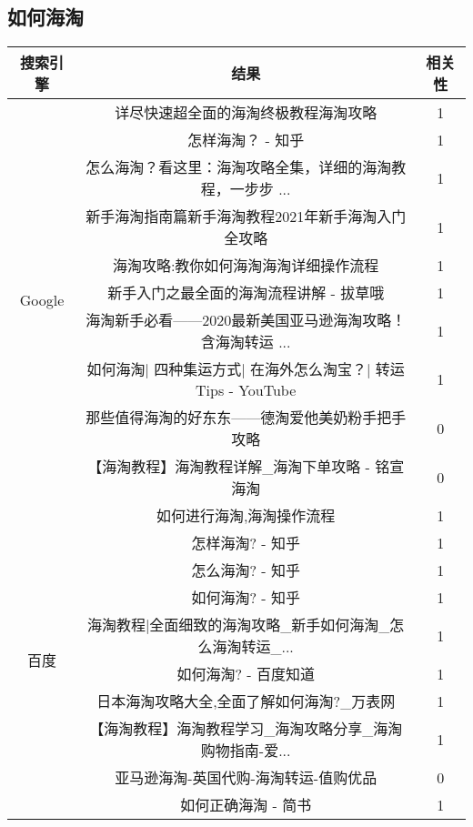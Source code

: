 \documentclass[a4paper]{article}
\begin{document}
\subsection{如何海淘}

\begin{center}
  \begin{tabular}{ |c|c|c| }
    \hline
    搜索引擎 & 结果 & 相关性 \\ \hline
    \multirow{10}{*}{Google}  & 详尽快速超全面的海淘终极教程海淘攻略 & 1 \\ \cline{2-3}
    & 怎样海淘？ - 知乎 & 1 \\ \cline{2-3}
    & 怎么海淘？看这里：海淘攻略全集，详细的海淘教程，一步步 ... & 1 \\ \cline{2-3}
    & 新手海淘指南篇新手海淘教程2021年新手海淘入门全攻略 & 1 \\ \cline{2-3}
    & 海淘攻略:教你如何海淘海淘详细操作流程 & 1 \\ \cline{2-3}
    & 新手入门之最全面的海淘流程讲解 - 拔草哦 & 1 \\ \cline{2-3}
    & 海淘新手必看——2020最新美国亚马逊海淘攻略！含海淘转运 ... & 1 \\ \cline{2-3}
    & 如何海淘| 四种集运方式| 在海外怎么淘宝？| 转运Tips - YouTube & 1 \\ \cline{2-3}
    & 那些值得海淘的好东东——德淘爱他美奶粉手把手攻略 & 0 \\ \cline{2-3}
    & 【海淘教程】海淘教程详解\_海淘下单攻略 - 铭宣海淘 & 0 \\ \cline{2-3}

    \hline\hline
    \multirow{10}{*}{百度}  & 如何进行海淘,海淘操作流程 & 1 \\ \cline{2-3}
    & 怎样海淘? - 知乎 & 1 \\ \cline{2-3}
    & 怎么海淘? - 知乎 & 1 \\ \cline{2-3}
    & 如何海淘? - 知乎 & 1 \\ \cline{2-3}
    & 海淘教程|全面细致的海淘攻略\_新手如何海淘\_怎么海淘转运\_... & 1 \\ \cline{2-3}
    & 如何海淘? - 百度知道 & 1 \\ \cline{2-3}
    & 日本海淘攻略大全,全面了解如何海淘?\_万表网 & 1 \\ \cline{2-3}
    & 【海淘教程】海淘教程学习\_海淘攻略分享\_海淘购物指南-爱... & 1 \\ \cline{2-3}
    & 亚马逊海淘-英国代购-海淘转运-值购优品 & 0 \\ \cline{2-3}
    & 如何正确海淘 - 简书 & 1 \\ \cline{2-3}
    \hline
  \end{tabular}
\end{center}
\end{document}
